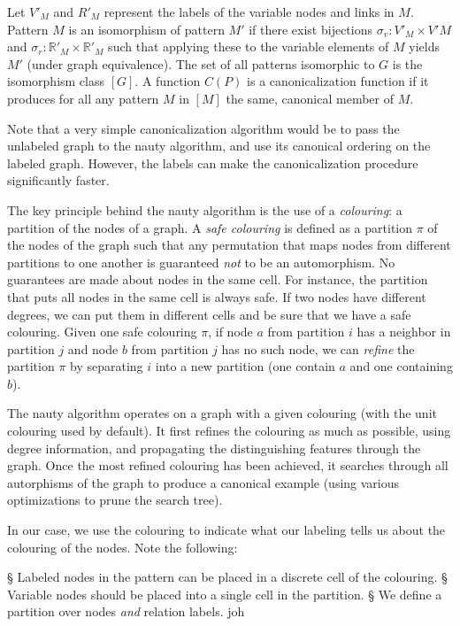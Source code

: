 \documentclass[11pt]{article}
\newcommand{\R}{{\mathbb R}}
\begin{document}
Let $V'_M$ and $R'_M$ represent the labels of the variable nodes and links in $M$. Pattern $M$ is an isomorphism of pattern $M'$ if there exist bijections $\sigma_v : V'_M \times V'M$ and $\sigma_r: \R'_M \times \R'_M$ such that applying these to the variable elements of $M$ yields $M'$ (under graph equivalence). The set of all patterns isomorphic to $G$ is the isomorphism class $[G]$. A function $C(P)$ is a canonicalization function if it produces for all any pattern $M$ in $[M]$ the same, canonical member of $M$.

Note that a very simple canonicalization algorithm would be to pass the unlabeled graph to the nauty algorithm, and use its canonical ordering on the labeled graph. However, the labels can make the canonicalization procedure significantly faster.

The key principle behind the nauty algorithm is the use of a \emph{colouring}: a partition of the nodes of a graph. A \emph{safe colouring} is defined as a partition $\pi$ of the nodes of the graph such that any permutation that maps nodes from different partitions to one another is guaranteed \emph{not} to be an automorphism. No guarantees are made about nodes in the same cell. For instance, the partition that puts all nodes in the same cell is always safe. If two nodes have different degrees, we can put them in different cells and be sure that we have a safe colouring. Given one safe colouring $\pi$, if node $a$ from partition $i$ has a neighbor in partition $j$ and node $b$ from partition $j$ has no such node, we can \emph{refine} the partition $\pi$ by separating $i$ into a new partition (one contain $a$ and one containing $b$). 

The nauty algorithm operates on a graph with a given colouring (with the unit colouring used by default). It first refines the colouring as much as possible, using degree information, and propagating the distinguishing features through the graph. Once the most refined colouring has been achieved, it searches through all autorphisms of the graph to produce a canonical example (using various optimizations to prune the search tree).

In our case, we use the colouring to indicate what our labeling tells us about the colouring of the nodes.
Note the following:
\begin{easylist}
§ Labeled nodes in the pattern can be placed in a discrete cell of the colouring.
§ Variable nodes should be placed into a single cell in the partition.
§ We define a partition over nodes \emph{and} relation labels. 
joh\end{easylist}
\end{document}
